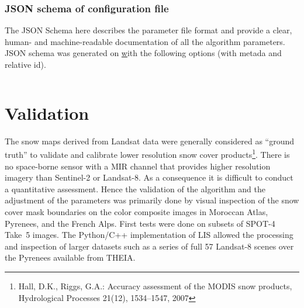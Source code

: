 \documentclass[a4paper]{article}
\begin{document}
\newpage

\subsubsection{JSON schema of configuration file}\label{par:jsonparam}

The JSON Schema here describes the parameter file format and provide a clear, human-
and machine-readable documentation of all the algorithm parameters. JSON schema
was generated on \href{https://jsonschema.net} with the following options (with
metada and relative id).

\inputminted[tabsize=2, fontsize=\tiny]{js}{schema.json}

\section{Validation}\label{par:validation}

The snow maps derived from Landsat data were generally considered as ``ground truth'' to validate and calibrate lower resolution snow cover products\footnote{Hall, D.K., Riggs, G.A.: Accuracy assessment of the MODIS snow products, Hydrological Processes 21(12), 1534–1547, 2007}. There is no space-borne sensor with a MIR channel that provides higher resolution imagery than Sentinel-2 or Landsat-8. As a consequence it is difficult to conduct a quantitative assessment. Hence the validation of the algorithm and the adjustment of the parameters was primarily done by visual inspection of the snow cover mask boundaries on the color composite images in Moroccan Atlas, Pyrenees, and the French Alps. First tests were done on subsets of SPOT-4 Take~5 images. The Python/C++ implementation of LIS allowed the processing and inspection of larger datasets such as a series of full 57 Landsat-8 scenes over the Pyrenees available from THEIA.
\end{document}
